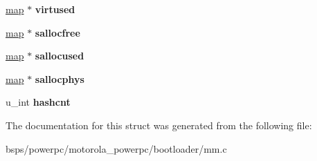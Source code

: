 \begin{DoxyCompactItemize}
\mbox{\hyperlink{struct__map}{map}} $\ast$ {\bfseries virtused}
\item 
\mbox{\label{struct__mm__private_aab63cf5f7c8ec4ee78b410a8924dd733}} 
\mbox{\hyperlink{struct__map}{map}} $\ast$ {\bfseries sallocfree}
\item 
\mbox{\label{struct__mm__private_a81ebb7ef39c1d98759b3ff2f5b2fe349}} 
\mbox{\hyperlink{struct__map}{map}} $\ast$ {\bfseries sallocused}
\item 
\mbox{\label{struct__mm__private_a160bde9452898fcc39335a90e8e201e0}} 
\mbox{\hyperlink{struct__map}{map}} $\ast$ {\bfseries sallocphys}
\item 
\mbox{\label{struct__mm__private_a87a4cfd4d8bb1f67c7608ab341d792b5}} 
u\+\_\+int {\bfseries hashcnt}
\end{DoxyCompactItemize}


The documentation for this struct was generated from the following file\+:\begin{DoxyCompactItemize}
\item 
bsps/powerpc/motorola\+\_\+powerpc/bootloader/mm.\+c\end{DoxyCompactItemize}
